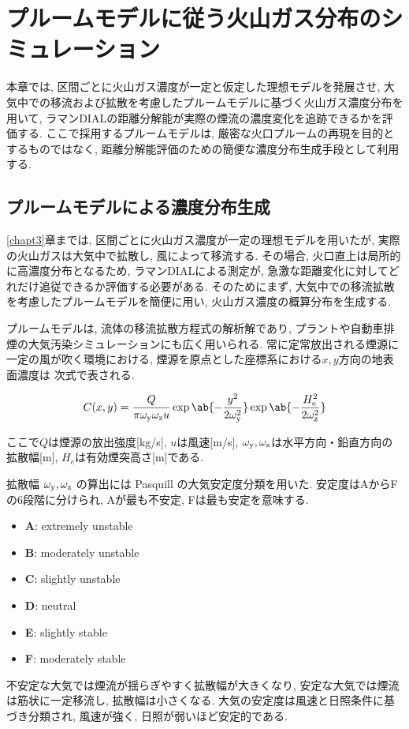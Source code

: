 \chapter[
  プルームモデルに従う火山ガス分布のシミュレーション
]{
  プルームモデルに従う火山ガス分布のシミュレーション
}
\label{chapt4}

本章では, 区間ごとに火山ガス濃度が一定と仮定した理想モデルを発展させ,
大気中での移流および拡散を考慮したプルームモデルに基づく火山ガス濃度分布を用いて,
ラマンDIALの距離分解能が実際の煙流の濃度変化を追跡できるかを評価する.
ここで採用するプルームモデルは, 厳密な火口プルームの再現を目的とするものではなく,
距離分解能評価のための簡便な濃度分布生成手段として利用する.

\section{プルームモデルによる濃度分布生成}

\ref{chapt3}章までは, 区間ごとに火山ガス濃度が一定の理想モデルを用いたが,
実際の火山ガスは大気中で拡散し, 風によって移流する.
その場合, 火口直上は局所的に高濃度分布となるため,
ラマンDIALによる測定が, 急激な距離変化に対してどれだけ追従できるか評価する必要がある.
そのためにまず, 大気中での移流拡散を考慮したプルームモデルを簡便に用い,
火山ガス濃度の概算分布を生成する.

プルームモデルは, 流体の移流拡散方程式の解析解であり,
プラントや自動車排煙の大気汚染シミュレーションにも広く用いられる.
常に定常放出される煙源に一定の風が吹く環境における,
煙源を原点とした座標系における$x, y$方向の地表面濃度は
次式で表される.

\begin{align}
  C(x,y) = \frac{Q}{\pi \sprdy \sprdz u}
  \exp \ab\{
    - \frac{y^2}{2\sprdy ^2}
  \}\exp \ab\{
    - \frac{\subrm{H}{e}^2}{2\sprdz ^2}
  \}\label{equ:plume}
\end{align}

\noindent
ここで$Q$は煙源の放出強度[\unit{kg/s}], 
$u$は風速[\unit{m/s}], 
$\omega_{\mathrm{y}}, \omega_{\mathrm{z}}$は水平方向・鉛直方向の拡散幅[\unit{m}], 
$H_e$は有効煙突高さ[\unit{m}]である.

\newpage
拡散幅 $\omega_{\mathrm{y}}, \omega_{\mathrm{z}}$ の算出には Pasquill の大気安定度分類を用いた\cite{pasquill}. 
安定度はAからFの6段階に分けられ, 
Aが最も不安定, Fは最も安定を意味する.
\begin{itemize}
    \item \textbf{A}: extremely unstable
    \item \textbf{B}: moderately unstable
    \item \textbf{C}: slightly unstable
    \item \textbf{D}: neutral
    \item \textbf{E}: slightly stable
    \item \textbf{F}: moderately stable
\end{itemize}
不安定な大気では煙流が揺らぎやすく拡散幅が大きくなり,
安定な大気では煙流は筋状に一定移流し, 拡散幅は小さくなる.
大気の安定度は風速と日照条件に基づき分類され,
風速が強く, 日照が弱いほど安定的である.

